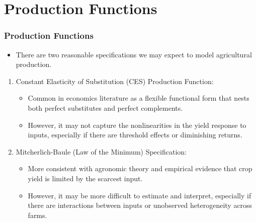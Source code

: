 \documentclass[xcolor = x11names, compress, aspectratio = 169]{beamer}
\renewcommand{\(}{\begin{columns}}
\renewcommand{\)}{\end{columns}}
\newcommand{\<}[1]{\begin{column}{#1}}
\renewcommand{\>}{\end{column}}
\begin{document}
\section{Production Functions}
    \begin{frame}
    \frametitle{Production Functions}
        \begin{itemize}
            \item There are two reasonable specifications we may expect to model agricultural production. 
        \end{itemize}
        \begin{enumerate}
            \item Constant Elasticity of Substitution (CES) Production Function:
            \begin{itemize}
                \item Common in economics literature as a flexible functional form that nests both perfect substitutes and perfect complements. 
                \item However, it may not capture the nonlinearities in the yield response to inputs, especially if there are threshold effects or diminishing returns. 
            \end{itemize}
            \item Mitcherlich-Baule (Law of the Minimum) Specification:
            \begin{itemize}
                \item More consistent with agronomic theory and empirical evidence that crop yield is limited by the scarcest input. 
                \item However, it may be more difficult to estimate and interpret, especially if there are interactions between inputs or unobserved heterogeneity across farms.
            \end{itemize}
        \end{enumerate}
    \end{frame}
\end{document}

